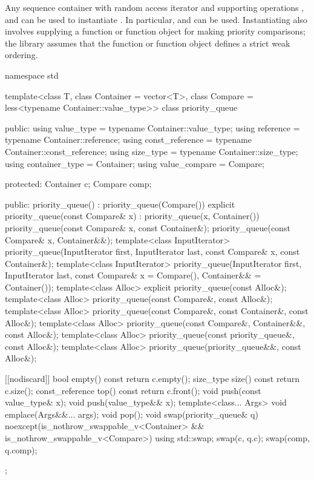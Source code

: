 \pnum
{}%
Any sequence container with random access iterator and supporting operations
,
and
can be used to instantiate
.
In particular,
and
can be used.
Instantiating
also involves supplying a function or function object for making
priority comparisons; the library assumes that the function or function
object defines a strict weak ordering.

\begin{codeblock}
namespace std {
  template<class T, class Container = vector<T>,
           class Compare = less<typename Container::value_type>>
  class priority_queue {
  public:
    using value_type      = typename Container::value_type;
    using reference       = typename Container::reference;
    using const_reference = typename Container::const_reference;
    using size_type       = typename Container::size_type;
    using container_type  = Container;
    using value_compare   = Compare;

  protected:
    Container c;
    Compare comp;

  public:
    priority_queue() : priority_queue(Compare()) {}
    explicit priority_queue(const Compare& x) : priority_queue(x, Container()) {}
    priority_queue(const Compare& x, const Container&);
    priority_queue(const Compare& x, Container&&);
    template<class InputIterator>
      priority_queue(InputIterator first, InputIterator last, const Compare& x,
                     const Container&);
    template<class InputIterator>
      priority_queue(InputIterator first, InputIterator last,
                     const Compare& x = Compare(), Container&& = Container());
    template<class Alloc> explicit priority_queue(const Alloc&);
    template<class Alloc> priority_queue(const Compare&, const Alloc&);
    template<class Alloc> priority_queue(const Compare&, const Container&, const Alloc&);
    template<class Alloc> priority_queue(const Compare&, Container&&, const Alloc&);
    template<class Alloc> priority_queue(const priority_queue&, const Alloc&);
    template<class Alloc> priority_queue(priority_queue&&, const Alloc&);

    [[nodiscard]] bool empty() const { return c.empty(); }
    size_type size()  const          { return c.size(); }
    const_reference   top() const    { return c.front(); }
    void push(const value_type& x);
    void push(value_type&& x);
    template<class... Args> void emplace(Args&&... args);
    void pop();
    void swap(priority_queue& q) noexcept(is_nothrow_swappable_v<Container> &&
                                          is_nothrow_swappable_v<Compare>)
      { using std::swap; swap(c, q.c); swap(comp, q.comp); }
  };

}
\end{codeblock}
